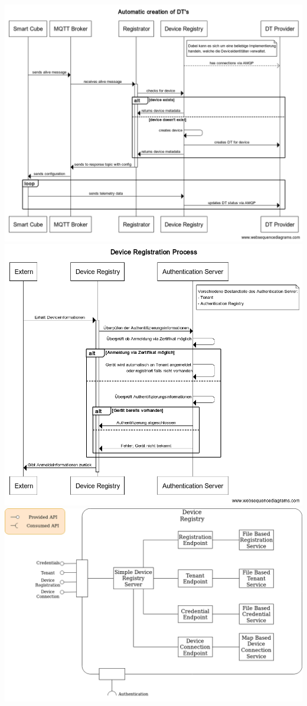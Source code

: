 \documentclass[
	12pt,
	BCOR=5mm,
	DIV=12,
	headinclude=on,
	footinclude=off,
	parskip=half,
	bibliography=totoc,
	listof=entryprefix,
	toc=listof,
	numbers=noenddot,
	plainfootsepline
]{scrreprt}
\begin{document}
\includegraphics[width=1.0\linewidth]{img/automatic_creation.png}
\includegraphics[width=1.0\linewidth]{img/device_registration.png}
\includegraphics[width=1.0\linewidth]{img/device-registry.png}
\end{document}
